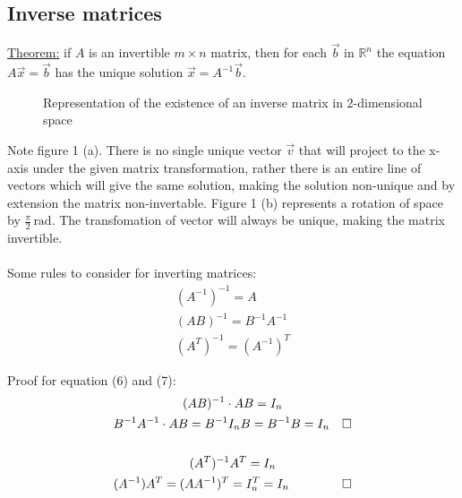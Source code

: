 \documentclass[11pt, a4paper]{article}
\newcommand*{\qed}{\hfill\ensuremath{\quad\square}}%
\newcommand*{\rad}{\ensuremath{\,\text{rad}}}
\begin{document}
\subsection{Inverse matrices}
\underline{Theorem:}
if $A$ is an invertible $m \times n$ matrix, then for each $\vec{b}$ in $\mathbb{R}^n$ the equation
$A\vec{x}=\vec{b}$ has the unique solution $\vec{x} = A^{-1}\vec{b}$.

\begin{figure}[h]
  \centering
  \qquad \;
  \caption{Representation of the existence of an inverse matrix in 2-dimensional space}
\end{figure}
Note figure 1 (a). There is no single unique vector $\vec{v}$ that will project to the x-axis under the
given matrix transformation, rather there is an entire line of vectors which will give the same solution,
making the solution non-unique and by extension the matrix non-invertable. Figure 1 (b) represents a rotation
of space by $\frac{\pi}{2}\rad$. The transfomation of vector will always be unique, making the matrix invertible.\\
\\
Some rules to consider for inverting matrices:
\begin{gather}
  (A^{-1})^{-1} = A\\
  (AB)^{-1} = B^{-1}A^{-1}\\
  (A^T)^{-1} = (A^{-1})^T
\end{gather}

Proof for equation (6) and (7):
\begin{gather*}
  (AB)^{-1} \cdot AB = I_n\\
  B^{-1}A^{-1} \cdot AB = B^{-1}I_nB = B^{-1}B = I_n \qed\\
  \\
  (A^T)^{-1} A^T = I_n\\
  (A^{-1})A^T = (AA^{-1})^T = I_n^T = I_n \qed
\end{gather*}
\end{document}
